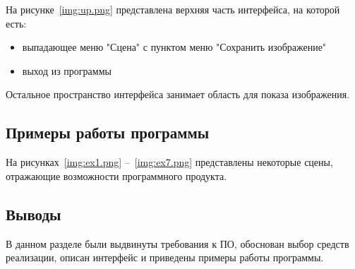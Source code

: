 
На рисунке~\ref{img:up.png} представлена верхняя часть интерфейса, на которой есть:
\begin{itemize}
	\item выпадающее меню "Сцена" с пунктом меню "Сохранить изображение"
	\item выход из программы
\end{itemize}


Остальное пространство интерфейса занимает область для показа изображения.

\subsection{Примеры работы программы}
На рисунках~\ref{img:ex1.png} --~\ref{img:ex7.png} представлены некоторые сцены, отражающие возможности программного продукта.

\subsection*{Выводы}
В данном разделе были выдвинуты требования к ПО, обоснован выбор средств реализации, описан интерфейс и приведены примеры работы программы.

\newpage
	